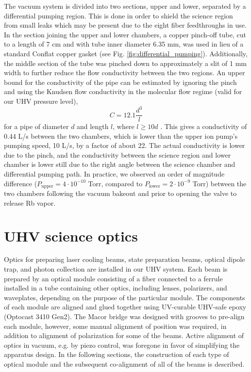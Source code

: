 The vacuum system is divided into two sections, upper and lower, separated by a differential pumping region. This is done in order to shield the science region from small leaks which may be present due to the eight fiber feedthroughs in use. In the section joining the upper and lower chambers, a copper pinch-off tube, cut to a length of 7 cm and with tube inner diameter 6.35 mm, was used in lieu of a standard Conflat copper gasket (see Fig. \ref{fig:differential_pumping}). Additionally, the middle section of the tube was pinched down to approximately a slit of 1 mm width to further reduce the flow conductivity between the two regions. An upper bound for the conductivity of the pipe can be estimated by ignoring the pinch and using the Knudsen flow conductivity in the molecular flow regime (valid for our UHV pressure level),
\begin{equation}
     C = 12.1\frac{d^3}{l}
\end{equation}
for a pipe of diameter $d$ and length $l$, where $l \geq 10d$ \cite{Marquardt1999}. This gives a conductivity of 0.44 L/s between the two chambers, which is lower than the upper ion pump's pumping speed, 10 L/s, by a factor of about 22. The actual conductivity is lower due to the pinch, and the conductivity between the science region and lower chamber is lower still due to the right angle between the science chamber and differential pumping path. In practice, we observed an order of magnitude difference ($P_{\textrm{upper}}=4\cdot10^{-10}$ Torr, compared to $P_{\textrm{lower}}=2\cdot10^{-9}$ Torr) between the two chambers following the vacuum bakeout and prior to opening the valve to release Rb vapor.

\section{UHV science optics}\label{sec:science_optics}

Optics for preparing laser cooling beams, state preparation beams, optical dipole trap, and photon collection are installed in our UHV system. Each beam is prepared by an optical module consisting of a fiber connected to a ferrule installed in a tube containing other optics, including lenses, polarizers, and waveplates, depending on the purpose of the particular module. The components of each module are aligned and glued together using UV-curable UHV-safe epoxy (Optocast 3410 Gen2). The Macor bridge was designed with grooves to pre-align each module, however, some manual alignment of position was required, in addition to alignment of polarization for some of the beams. Active alignment of optics in vacuum, e.g. by piezo control, was foregone in favor of simplifying the apparatus design. In the following sections, the construction of each type of optical module and the subsequent co-alignment of all of the beams is described. 

